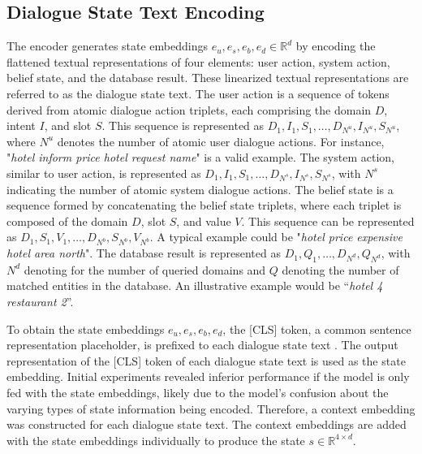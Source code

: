 \documentclass[letterpaper]{article} %
\begin{document}
\subsection{Dialogue State Text Encoding}
The encoder generates state embeddings $e_u, e_s, e_b, e_d \in \mathbb{R}^d$ by encoding the flattened textual representations of four elements: user action, system action, belief state, and the database result. 
These linearized textual representations are referred to as the dialogue state text.
The user action is a sequence of tokens derived from atomic dialogue action triplets, each comprising the domain $D$, intent $I$, and slot $S$. This sequence is represented as $D_1, I_1, S_1, \ldots, D_{N^u}, I_{N^u}, S_{N^u}$, where $N^u$ denotes the number of atomic user dialogue actions. For instance, "\textit{hotel inform price hotel request name}" is a valid example.
The system action, similar to user action, is represented as $D_1, I_1, S_1, \ldots, D_{N^s}, I_{N^s}, S_{N^s}$, with $N^s$ indicating the number of atomic system dialogue actions.
The belief state is a sequence formed by concatenating the belief state triplets, where each triplet is composed of the domain $D$, slot $S$, and value $V$. This sequence can be represented as $D_1, S_1, V_1, \dots, D_{N^b}, S_{N^b}, V_{N^b}$. A typical example could be "\textit{hotel price expensive hotel area north}".
The database result is represented as $D_1, Q_1, \dots, D_{N^d}, Q_{N^d}$, with $N^d$ denoting for the number of queried domains and $Q$ denoting the number of matched entities in the database. An illustrative example would be “\textit{hotel 4 restaurant 2}”.

To obtain the state embeddings $e_u, e_s, e_b, e_d$, the [CLS] token, a common sentence representation placeholder, is prefixed to each dialogue state text \cite{devlin2018bert}. The output representation of the [CLS] token of each dialogue state text is used as the state embedding.
Initial experiments revealed inferior performance if the model is only fed with the state embeddings, likely due to the model's confusion about the varying types of state information being encoded.
Therefore, a context embedding was constructed for each dialogue state text. The context embeddings are added with the state embeddings individually to produce the state $s \in \mathbb{R}^{4 \times d}$.
\end{document}
